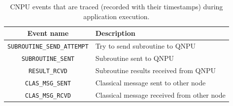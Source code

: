 \clearpage

\begin{table}[t]
    \centering
    \begin{tabular}{|c|l|}
    \hline
    \textbf{Event name} & \textbf{Description} \\ 
    \hline
    \texttt{SUBROUTINE\_SEND\_ATTEMPT} & Try to send subroutine to \ac{QNPU} \\
    \texttt{SUBROUTINE\_SENT} & Subroutine sent to \ac{QNPU} \\ 
    \texttt{RESULT\_RCVD} & Subroutine results received from \ac{QNPU} \\
    \texttt{CLAS\_MSG\_SENT} & Classical message sent to other node \\
    \texttt{CLAS\_MSG\_RCVD} & Classical message received from other node \\
    \hline
    \end{tabular}
    \caption{\ac{CNPU} events that are traced (recorded with their timestamps) during application execution.}
    \label{tab:host_events}
\end{table}

